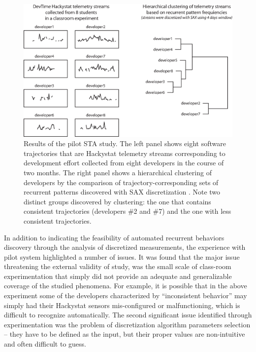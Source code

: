 \begin{figure}[t]
   \centering
   \includegraphics[width=145mm]{figures/STA1.eps}
   \caption[Results of the pilot STA study.]{Results of the pilot STA study. 
   The left panel shows eight software trajectories that are Hackystat telemetry streams 
   corresponding to development effort \cite{citeulike:557296} collected from eight developers in the course of two months.
   The right panel shows a hierarchical clustering of developers by the comparison of trajectory-corresponding sets of 
   recurrent patterns discovered with SAX discretization \cite{sax}. 
   Note two distinct groups discovered by clustering: the one that contains consistent trajectories (developers \#2 and \#7) 
   and the one with less consistent trajectories.}
   \label{fig:STA1-results}
\end{figure}

In addition to indicating the feasibility of automated recurrent behaviors discovery through the analysis of discretized measurements, the experience with pilot system highlighted a number of issues. It was found that the major issue threatening the external validity of study, was the small scale of class-room experimentation that simply did not provide an adequate and generalizable coverage of the studied phenomena. For example, it is possible that in the above experiment some of the developers characterized by ``inconsistent behavior'' may simply had their Hackystat sensors mis-configured or malfunctioning, which is difficult to recognize automatically. The second significant issue identified through experimentation was the problem of discretization algorithm parameters selection -- they have to be defined as the input, but their proper values are non-intuitive and often difficult to guess.

